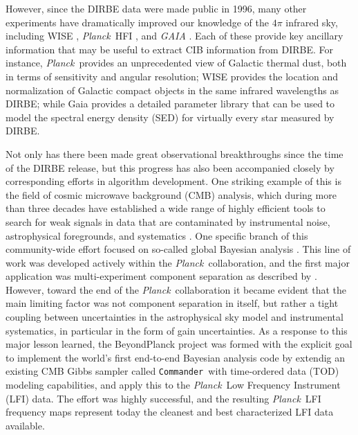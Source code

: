 \documentclass{aa}
\def\commander{\texttt{Commander}}
\def\Planck{\textit{Planck}}
\begin{document}
However, since the DIRBE data were made public in 1996, many other experiments have dramatically improved our knowledge of the $4\pi$ infrared sky, including WISE \citep{wright:2010}, \Planck\ HFI \citep{planck2016-l03}, and \textit{GAIA} \citep{gaia:2016}. Each of these provide key ancillary information that may be useful to extract CIB information from  DIRBE. For instance, \Planck\ provides an unprecedented view of Galactic thermal dust, both in terms of sensitivity and angular resolution; WISE provides the location and normalization of Galactic compact objects in the same infrared wavelengths as DIRBE; while Gaia provides a detailed parameter library that can be used to model the spectral energy density (SED) for virtually every star measured by DIRBE.

Not only has there been made great observational breakthroughs since the time of the DIRBE release, but this progress has also been accompanied closely by corresponding efforts in algorithm development. One striking example of this is the field of cosmic microwave background (CMB) analysis, which during more than three decades have established a wide range of highly efficient tools to search for weak signals in data that are contaminated by instrumental noise, astrophysical foregrounds, and systematics \citep[e.g.,][]{bennett2012,pb2015,planck2016-l01}. One specific branch of this community-wide effort focused on so-called global Bayesian analysis \citep{jewell2004,wandelt2004}. This line of work was developed actively within the \Planck\ collaboration, and the first major application was multi-experiment component separation as described by \citet{planck2014-a12}. However, toward the end of the \Planck\ collaboration it became evident that the main limiting factor was not component separation in itself, but rather a tight coupling between uncertainties in the astrophysical sky model and instrumental systematics, in particular in the form of gain uncertainties. As a response to this major lesson learned, the BeyondPlanck project \citep{bp01} was formed with the explicit goal to implement the world's first end-to-end Bayesian analysis code by extendig an existing CMB Gibbs sampler called \commander\ with time-ordered data (TOD) modeling capabilities, and apply this to the \Planck\ Low Frequency Instrument (LFI) data. The effort was highly successful, and the resulting \Planck\ LFI frequency maps represent today the cleanest and best characterized LFI data available.
\end{document}
